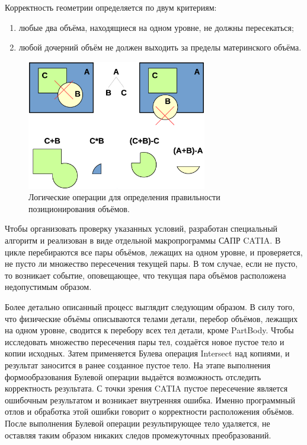 Корректность геометрии определяется по двум критериям:
\begin{enumerate}
\item любые два объёма, находящиеся на одном уровне, не должны пересекаться;
\item любой дочерний объём не должен выходить за пределы материнского объёма.
\end{enumerate}

\begin{figure}[H]
\centering
\includegraphics[width=0.7\textwidth]{pictures/Checker.eps}
\caption{Логические операции для определения правильности позиционирования объёмов.}
\label{fig:CheckerOperations}
\end{figure}

Чтобы организовать проверку указанных условий, разработан специальный алгоритм и реализован в виде отдельной макропрограммы  САПР CATIA. В цикле перебираются все пары объёмов, лежащих на одном уровне, и проверяется, не пусто ли множество пересечения текущей пары. В том случае, если не пусто, то возникает событие, оповещающее, что текущая пара объёмов расположена недопустимым образом.

Более детально описанный процесс выглядит следующим образом. В силу того, что физические объёмы описываются телами детали, перебор объёмов, лежащих на одном уровне, сводится к перебору всех тел детали, кроме PartBody. Чтобы исследовать множество пересечения пары тел, создаётся новое пустое тело и копии исходных. Затем применяется Булева операция Intersect над копиями, и результат заносится в ранее созданное пустое тело. На этапе выполнения формообразования Булевой операции выдаётся возможность отследить корректность результата. С точки зрения CATIA пустое пересечение является ошибочным результатом и возникает внутренняя ошибка. Именно программный отлов и обработка этой ошибки говорит о корректности расположения объёмов. После выполнения Булевой операции результирующее тело удаляется, не оставляя таким образом никаких следов промежуточных преобразований.

